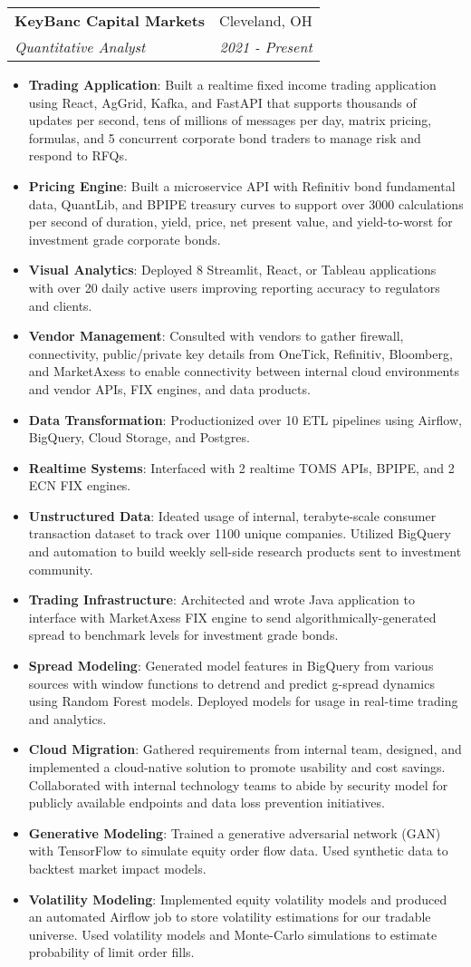 \documentclass[letterpaper,11pt]{article}
\makeatletter
\newcommand{\resumeItem}[2]{
  \item\small{
    \textbf{#1}{: #2 \vspace{-2pt}}
  }
}
\newcommand{\resumeSubheading}[4]{
  \vspace{-1pt}\item
    \begin{tabular*}{0.97\textwidth}[t]{l@{\extracolsep{\fill}}r}
      \textbf{#1} & #2 \\
      \textit{\small#3} & \textit{\small #4} \\
    \end{tabular*}\vspace{-5pt}
}
\newcommand{\resumeItemListStart}{\begin{itemize}}
\newcommand{\resumeItemListEnd}{\end{itemize}\vspace{-5pt}}
\makeatother
\begin{document}
    \resumeSubheading
      {KeyBanc Capital Markets}{Cleveland, OH}
      {Quantitative Analyst}{2021 - Present}
      \resumeItemListStart
        \resumeItem{Trading Application}
            {Built a realtime fixed income trading application using React, AgGrid, Kafka, and FastAPI that supports thousands of updates per second, tens of millions of messages per day, matrix pricing, formulas, and 5 concurrent corporate bond traders to manage risk and respond to RFQs.}
        \resumeItem{Pricing Engine}
            {Built a microservice API with Refinitiv bond fundamental data, QuantLib, and BPIPE treasury curves to support over 3000 calculations per second of duration, yield, price, net present value, and yield-to-worst for investment grade corporate bonds.}
        \resumeItem{Visual Analytics}
            {Deployed 8 Streamlit, React, or Tableau applications with over 20 daily active users improving reporting accuracy to regulators and clients.}
        \resumeItem{Vendor Management}
          {Consulted with vendors to gather firewall, connectivity, public/private key details from OneTick, Refinitiv, Bloomberg, and MarketAxess to enable connectivity between internal cloud environments and vendor APIs, FIX engines, and data products.}
        \resumeItem{Data Transformation}
            {Productionized over 10 ETL pipelines using Airflow, BigQuery, Cloud Storage, and Postgres.}
        \resumeItem{Realtime Systems}
          {Interfaced with 2 realtime TOMS APIs, BPIPE, and 2 ECN FIX engines.}
        \resumeItem{Unstructured Data}
          {Ideated usage of internal, terabyte-scale consumer transaction dataset to track over 1100 unique companies. Utilized BigQuery and automation to build weekly sell-side research products sent to investment community.}
        \resumeItem{Trading Infrastructure}
          {Architected and wrote Java application to interface with MarketAxess FIX engine to send algorithmically-generated spread to benchmark levels for investment grade bonds.}
        \resumeItem{Spread Modeling}
            {Generated model features in BigQuery from various sources with window functions to detrend and predict g-spread dynamics using Random Forest models. Deployed models for usage in real-time trading and analytics.}
        \resumeItem{Cloud Migration}
            {Gathered requirements from internal team, designed, and implemented a cloud-native solution to promote usability and cost savings. Collaborated with internal technology teams to abide by security model for publicly available endpoints and data loss prevention initiatives.}
        \resumeItem{Generative Modeling}
            {Trained a generative adversarial network (GAN) with TensorFlow to simulate equity order flow data. Used synthetic data to backtest market impact models.}
        \resumeItem{Volatility Modeling}
            {Implemented equity volatility models and produced an automated Airflow job to store volatility estimations for our tradable universe. Used volatility models and Monte-Carlo simulations to estimate probability of limit order fills.}
      \resumeItemListEnd
\end{document}

